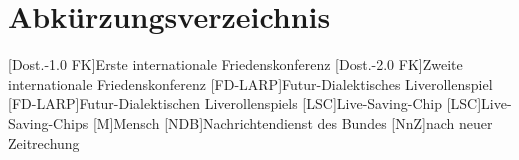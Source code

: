 \newpage
\thispagestyle{plain}
\chapter*{Abkürzungsverzeichnis}
\begin{acronym}
	[Dost.-1.0 FK]{Erste internationale Friedenskonferenz}
	[Dost.-2.0 FK]{Zweite internationale Friedenskonferenz}
	[FD-LARP]{Futur-Dialektisches Liverollenspiel}
	[FD-LARP]{Futur-Dialektischen Liverollenspiels}
	[LSC]{Live-Saving-Chip}
	[LSC]{Live-Saving-Chips}
	{Mensch}
	[NDB]{Nach\-rich\-ten\-dienst des Bundes}
	[NnZ]{nach neuer Zeitrechung}
\end{acronym}


